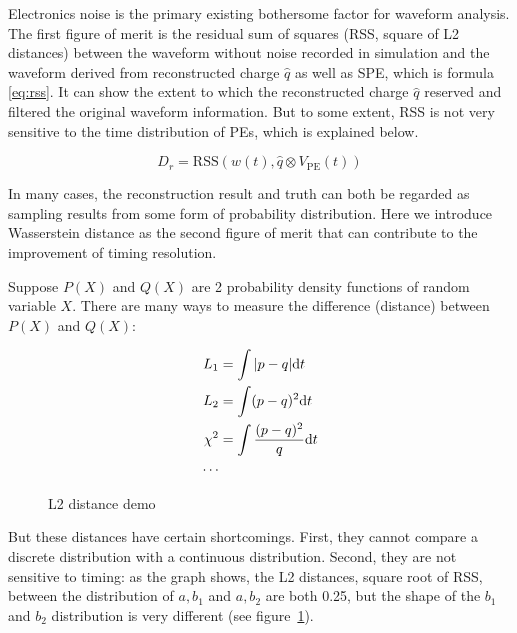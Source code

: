 Electronics noise is the primary existing bothersome factor for waveform analysis. The first figure of merit is the residual sum of squares (RSS, square of L2 distances) between the waveform without noise recorded in simulation and the waveform derived from reconstructed charge $\hat{q}$ as well as SPE, which is formula \eqref{eq:rss}. It can show the extent to which the reconstructed charge $\hat{q}$ reserved and filtered the original waveform information. But to some extent, RSS is not very sensitive to the time distribution of PEs, which is explained below. 

\begin{equation}
    D_r = \mathrm{RSS}(w(t), \hat{q} \otimes V_\mathrm{PE}(t)) \label{eq:rss}
\end{equation}

In many cases, the reconstruction result and truth can both be regarded as sampling results from some form of probability distribution. Here we introduce Wasserstein distance as the second figure of merit that can contribute to the improvement of timing resolution. 

Suppose $P(X)$ and $Q(X)$ are 2 probability density functions of random variable $X$. There are many ways to measure the difference (distance) between $P(X)$ and $Q(X)$: 

\begin{minipage}{.3\textwidth}
\begin{align*}
    L_{1} &= \int|p-q| \mathrm{d} t \\
    L_{2} &= \int(p-q)^{2} \mathrm{d} t \\
    \chi^{2} &= \int\frac{(p-q)^{2}}{q} \mathrm{d} t \\
    \cdots
\end{align*}
\end{minipage}
\begin{minipage}{.7\textwidth}
\begin{figure}[H]
    \centering
    \scalebox{0.4}{}
    \caption{\label{fig:l2} L2 distance demo}
\end{figure}
\end{minipage}

But these distances have certain shortcomings. First, they cannot compare a discrete distribution with a continuous distribution. Second, they are not sensitive to timing: as the graph shows, the L2 distances, square root of RSS, between the distribution of $a,b_{1}$ and $a,b_{2}$ are both 0.25, but the shape of the $b_{1}$ and $b_{2}$ distribution is very different (see figure~\ref{fig:l2}). 

